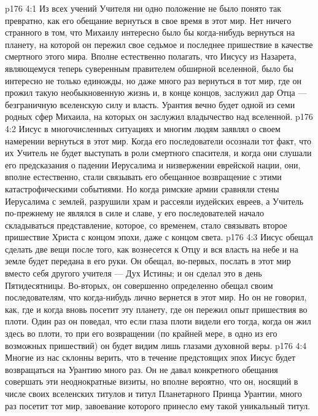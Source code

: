 \vs p176 4:1 Из всех учений Учителя ни одно положение не было понято так превратно, как его обещание вернуться в свое время в этот мир. Нет ничего странного в том, что Михаилу интересно было бы когда\hyp{}нибудь вернуться на планету, на которой он пережил свое седьмое и последнее пришествие в качестве смертного этого мира. Вполне естественно полагать, что Иисусу из Назарета, являющемуся теперь суверенным правителем обширной вселенной, было бы интересно не только единожды, но даже много раз вернуться в тот мир, где он прожил такую необыкновенную жизнь и, в конце концов, заслужил дар Отца --- безграничную вселенскую силу и власть. Урантия вечно будет одной из семи родных сфер Михаила, на которых он заслужил владычество над вселенной.
\vs p176 4:2 Иисус в многочисленных ситуациях и многим людям заявлял о своем намерении вернуться в этот мир. Когда его последователи осознали тот факт, что их Учитель не будет выступать в роли смертного спасителя, и когда они слушали его предсказания о падении Иерусалима и низвержении еврейской нации, они, вполне естественно, стали связывать его обещанное возвращение с этими катастрофическими событиями. Но когда римские армии сравняли стены Иерусалима с землей, разрушили храм и рассеяли иудейских евреев, а Учитель по\hyp{}прежнему не являлся в силе и славе, у его последователей начало складываться представление, которое, со временем, стало связывать второе пришествие Христа с концом эпохи, даже с концом света.
\vs p176 4:3 Иисус обещал сделать две вещи после того, как вознесется к Отцу и вся власть на небе и на земле будет передана в его руки. Он обещал, во\hyp{}первых, послать в этот мир вместо себя другого учителя --- Дух Истины; и он сделал это в день Пятидесятницы. Во\hyp{}вторых, он совершенно определенно обещал своим последователям, что когда\hyp{}нибудь лично вернется в этот мир. Но он не говорил, как, где и когда вновь посетит эту планету, где он пережил опыт пришествия во плоти. Один раз он поведал, что если глаза плоти видели его тогда, когда он жил здесь во плоти, то при его возвращении (по крайней мере, в одно из его возможных пришествий) он будет видим лишь глазами духовной веры.
\vs p176 4:4 Многие из нас склонны верить, что в течение предстоящих эпох Иисус будет возвращаться на Урантию много раз. Он не давал конкретного обещания совершать эти неоднократные визиты, но вполне вероятно, что он, носящий в числе своих вселенских титулов и титул Планетарного Принца Урантии, много раз посетит тот мир, завоевание которого принесло ему такой уникальный титул.
